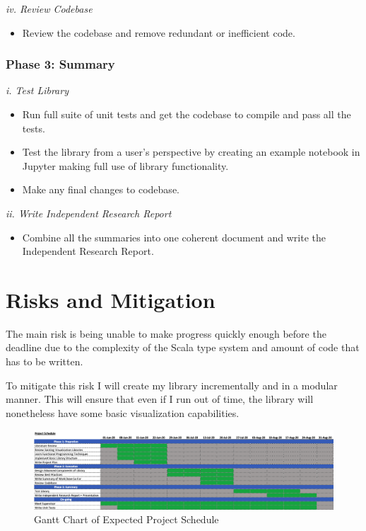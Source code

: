 \documentclass[12pt]{article}
\begin{document}
	\textit{iv. Review Codebase}
	
	\begin{itemize}
		\item Review the codebase and remove redundant or inefficient code. 
	\end{itemize}
	
	\subsubsection{Phase 3: Summary}
	
	\textit{i. Test Library}
	
	\begin{itemize}
		\item Run full suite of unit tests and get the codebase to compile and pass all the tests. 
		
		\item Test the library from a user's perspective by creating an example notebook in Jupyter making full use of library functionality. 
		
		\item Make any final changes to codebase.
	\end{itemize}
	
	\textit{ii. Write Independent Research Report}
	
	\begin{itemize}
		\item Combine all the summaries into one coherent document and write the Independent Research Report.
	\end{itemize}
	
	\section{Risks and Mitigation}
	
	The main risk is being unable to make progress quickly enough before the deadline due to the complexity of the Scala type system and amount of code that has to be written. 
	
	To mitigate this risk I will create my library incrementally and in a modular manner. This will ensure that even if I run out of time, the library will nonetheless have some basic visualization capabilities.
	
	\pagebreak
	\begin{landscape}
		\begin{figure}[h]
			\begin{center}
				\includegraphics[scale=0.65]{Gantt}
			\end{center}
			\caption{Gantt Chart of Expected Project Schedule}
		\end{figure}
		
	\end{landscape}
	\pagebreak
	\printbibliography
	
\end{document}
